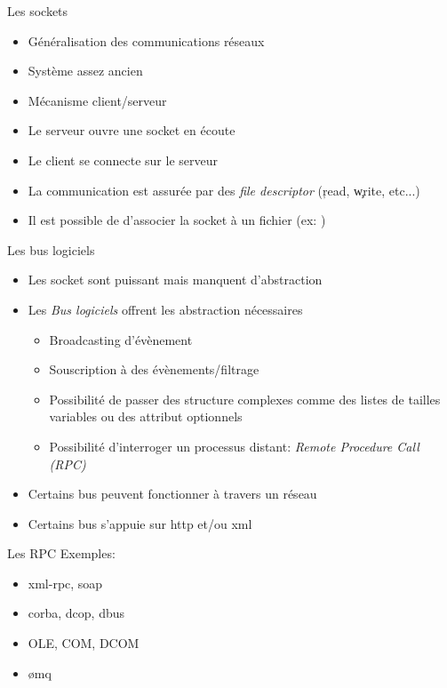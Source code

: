 \begin{frame}[fragile=singleslide]{Les sockets}
  \begin{itemize}
  \item Généralisation des communications réseaux
  \item Système assez ancien
  \item Mécanisme client/serveur
  \item Le serveur ouvre une socket en écoute
  \item Le client se connecte sur le serveur
  \item  La communication  est  assurée par  des \emph{file  descriptor}
    (\c{read}, \c{write}, etc...)
  \item  Il est  possible  de d'associer  la  socket à  un fichier  (ex:
    )
  \end{itemize}
\end{frame}

\begin{frame}[fragile=singleslide]{Les bus logiciels}
  \begin{itemize}
    \item Les socket sont puissant mais manquent d'abstraction
    \item Les \emph{Bus logiciels} offrent les abstraction nécessaires
      \begin{itemize}
        \item Broadcasting d'évènement
        \item Souscription à des évènements/filtrage
        \item Possibilité de passer  des structure complexes comme des
          listes de tailles variables ou des attribut optionnels
        \item   Possibilité   d'interroger   un   processus   distant:
          \emph{Remote Procedure Call (RPC)}
        \end{itemize}
      \item Certains bus peuvent fonctionner à travers un réseau
        \item Certains bus s'appuie sur http et/ou xml
  \end{itemize}
\end{frame}

\begin{frame}[fragile=singleslide]{Les RPC}
  Exemples:
  \begin{itemize}
  \item xml-rpc, soap
  \item corba, dcop, dbus
  \item OLE, COM, DCOM
  \item ømq
  \end{itemize}
\end{frame}
